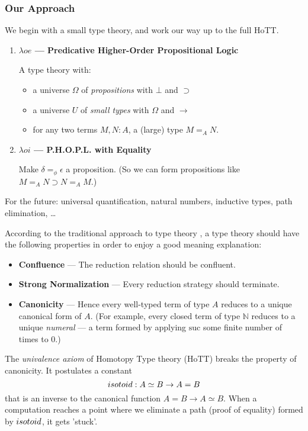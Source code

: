 {\begin{frame}
\frametitle{Our Approach}
We begin with a small type theory, and work our way up to the full HoTT. %
\begin{enumerate}
\item \textbf{$\lambda o e$ --- Predicative Higher-Order Propositional Logic}

 A type theory with:
  \begin{itemize}
  \item a universe $\Omega$ of \emph{propositions} with $\bot$ and $\supset$
  \item a universe $U$ of \emph{small types} with $\Omega$ and $\rightarrow$
  \item for any two terms $M, N : A$, a (large) type $M =_A N$.
  \end{itemize}
\item \textbf{$\lambda o i$ --- P.H.O.P.L. with Equality}

Make $\delta =_\phi \epsilon$ a proposition.  (So we can form propositions like $M =_A N \supset N =_A M$.)
\end{enumerate}
For the future: universal quantification, natural numbers, inductive types, path elimination, \ldots
\end{frame}
}

According to the traditional approach to type theory , a type theory should have the
following properties in order to enjoy a good meaning explanation:
\begin{itemize}
\item \textbf{Confluence} --- The reduction relation should be confluent.
\item \textbf{Strong Normalization} --- Every reduction strategy should terminate.
\item \textbf{Canonicity} --- Hence every well-typed term of type $A$ reduces to a unique canonical form of $A$.  (For example,
every closed term of type $\mathbb{N}$ reduces to a unique \emph{numeral} --- a term formed by applying $\mathrm{suc}$ some
finite number of times to 0.)
\end{itemize}

The \emph{univalence axiom} of Homotopy Type theory (HoTT)  breaks the property of canonicity.  It postulates a
constant
\[ isotoid : A \simeq B \rightarrow A = B \]
that is an inverse to the canonical function $A = B \rightarrow A \simeq B$.  When a computation reaches a point
where we eliminate a path (proof of equality) formed by $isotoid$, it gets 'stuck'.

